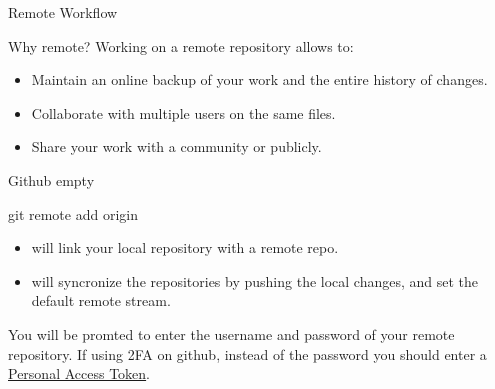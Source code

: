 \begin{frame}[fragile]{Remote Workflow}
\end{frame}

\begin{frame}[fragile]{Why remote?}
    Working on a remote repository allows to:
    \begin{itemize}[<+->]
        \item Maintain an online backup of your work and the entire history of changes.
        \item Collaborate with multiple users on the same files.
        \item Share your work with a community or publicly.
    \end{itemize}
\end{frame}

\begin{frame}[fragile]{Github}
    empty
\end{frame}

\begin{frame}[fragile]{git remote add origin}
    \begin{itemize}
        \item {} will link your local repository with a remote repo.
        \item {} will syncronize the repositories by \alert{pushing} the local changes, and set the default remote stream.
    \end{itemize}
    \begin{block}{}
        You will be promted to enter the username and password of your remote repository.
        If using 2FA on github, instead of the password you should enter a \href{https://docs.github.com/en/github/authenticating-to-github/creating-a-personal-access-token}{Personal Access Token}.
    \end{block}
\end{frame}

